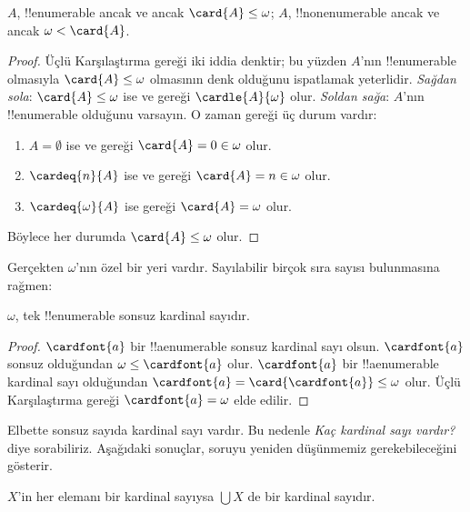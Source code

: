 \documentclass[../../../include/open-logic-section]{subfiles}
\begin{document}
\begin{prop}
$A$, !!{enumerable} ancak ve ancak $\card{A}\leq\omega$; $A$,
!!{nonenumerable} ancak ve ancak $\omega<\card{A}$.
\end{prop}

\begin{proof}
Üçlü Karşılaştırma gereği iki iddia denktir; bu yüzden $A$'nın
!!{enumerable} olmasıyla $\card{A}\leq\omega$ olmasının denk olduğunu
ispatlamak yeterlidir. \emph{Sağdan sola}: $\card{A}\leq\omega$ ise
 ve
 gereği $\cardle{A}{\omega}$ olur.
\emph{Soldan sağa}: $A$'nın !!{enumerable} olduğunu varsayın. O zaman
 gereği üç durum vardır:
\begin{enumerate}
	\item $A=\emptyset$ ise  ve
	 gereği
	$\card{A}=0\in\omega$ olur.
	\item $\cardeq{n}{A}$ ise  ve
	 gereği
	$\card{A}=n\in\omega$ olur.
	\item $\cardeq{\omega}{A}$ ise  gereği
	$\card{A}=\omega$ olur.
\end{enumerate}
Böylece her durumda $\card{A}\leq\omega$ olur.
\end{proof}
\noindent
Gerçekten $\omega$'nın özel bir yeri vardır. Sayılabilir birçok sıra sayısı
bulunmasına rağmen:

\begin{cor}
$\omega$, tek !!{enumerable} sonsuz kardinal sayıdır.
\end{cor}

\begin{proof}
$\cardfont{a}$ bir !!a{enumerable} sonsuz kardinal sayı olsun.
$\cardfont{a}$ sonsuz olduğundan $\omega\leq\cardfont{a}$ olur.
$\cardfont{a}$ bir !!a{enumerable} kardinal sayı olduğundan
$\cardfont{a}=\card{\cardfont{a}}\leq\omega$ olur. Üçlü Karşılaştırma
gereği $\cardfont{a}=\omega$ elde edilir.
\end{proof}

Elbette sonsuz sayıda kardinal sayı vardır. Bu nedenle \emph{Kaç kardinal
sayı vardır?} diye sorabiliriz. Aşağıdaki sonuçlar, soruyu yeniden
düşünmemiz gerekebileceğini gösterir.

\begin{prop}
$X$'in her elemanı bir kardinal sayıysa $\bigcup X$ de bir kardinal sayıdır.
\end{prop}
\end{document}

